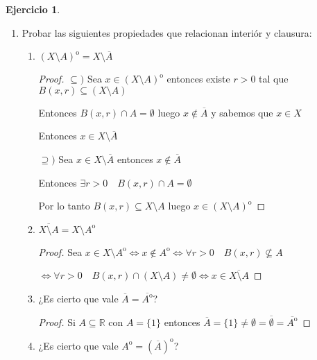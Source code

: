 \documentclass[11pt]{report}
\newcommand{\R}{\mathbb{R}}
\newcommand{\N}{\mathbb{N}}
\newcommand{\ra}{\rightarrow}
\newcommand{\ol}{\overline}
\newcommand{\open}{\mathrm{o}}
\theoremstyle{definition}
\newtheorem{ej}{Ejercicio}
\begin{document}
\begin{ej}
\begin{enumerate}
\begin{enumerate}
\begin{proof}
	  Juntando todo $\forall \epsilon > 0 \quad \exists n_0 \in \N$ tal que $d(x,a_n) \leq \epsilon \quad \forall n \geq n_0$

	  Entonces $a_n \ra x$

	$\Leftarrow ) $ Sea $a_{n} \in A \quad \forall n \in \N$ tal que $a_{n} \ra x $

	Entonces $\forall \epsilon > 0 \quad \exists a_{n} \in A $ tal que $d(x,a_{n}) \leq \epsilon$

	Luego $\forall \epsilon > 0$ tenemos $a_{n} \in B(x, \epsilon)$ con $a_{n} \in A$

      Por lo que $B(x,\epsilon) \cap A \neq \emptyset$

      Entonces $x \in \ol A$
	\end{proof}
      \end{enumerate}

    \item Probar las siguientes propiedades que relacionan interiór y clausura:
      \begin{enumerate}
	\item $(X \setminus A)^{\open} = X \setminus \ol A$
	  \begin{proof}
	  $\subseteq ) $ Sea $x \in (X\setminus A)^{\open}$ entonces existe $r>0$ tal que $B(x,r) \subseteq (X \setminus A)$

	    Entonces $B(x,r) \cap A = \emptyset$ luego $x \notin \ol A$ y sabemos que $x \in X$

	    Entonces $x \in X \setminus \ol A$

	  $\supseteq )$ Sea $x \in X \setminus \ol A$ entonces $x \notin \ol A$

	  Entonces $\exists r>0 \quad B(x,r) \cap A = \emptyset$

	Por lo tanto $B(x,r) \subseteq X \setminus A$ luego $x \in (X \setminus A)^{\open}$
	  \end{proof}
	\item $\ol{X \setminus A} = X \setminus A^{\open}$
	  \begin{proof}
	  Sea $x \in X\setminus A^{\open} \iff x \notin A^{\open} \iff \forall r > 0 \quad B(x,r) \not\subseteq A$ 

	  $\iff \forall r>0 \quad B(x,r) \cap (X\setminus A) \neq \emptyset \iff x \in \ol{X \setminus A}$
	  \end{proof}
	\item ¿Es cierto que vale $\ol A = \ol{A^{\open}}$?
	  \begin{proof}
	    Si $A \subseteq \R$ con $A = \{1\}$ entonces $\ol A = \{1\} \neq \emptyset = \ol{\emptyset} = \ol{A^{\open}}$
	  \end{proof}
	\item ¿Es cierto que vale $A^{\open} = (\ol A)^{\open}$? 
	  

\end{enumerate}
\end{enumerate}
\end{ej}
\end{document}
